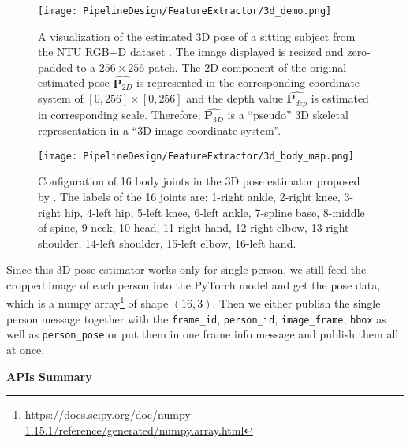 \begin{figure}[h!]
  \centering
  \texttt{[image: PipelineDesign/FeatureExtractor/3d\_demo.png]}
  \caption{A visualization of the estimated 3D pose of a sitting subject from the NTU RGB+D dataset
           \cite{DBLP:journals/corr/ShahroudyLNW16}. The image displayed is resized and zero-padded to
           a $256 \times 256$ patch. The 2D component of the original estimated pose $\hat{\mathbf{P}
           _{2D}}$ is represented in the corresponding coordinate system of $[0, 256] \times [0, 256]$
           and the depth value $\hat{\mathbf{P}_{dep}}$ is estimated in corresponding scale. Therefore,
           $\hat{\mathbf{P}_{3D}}$ is a “pseudo” 3D skeletal representation in a “3D image coordinate
           system”.}
  \label{fig:3d_demo}
\end{figure} 

\begin{figure}[h!]
  \centering
  \texttt{[image: PipelineDesign/FeatureExtractor/3d\_body\_map.png]}
  \caption{Configuration of 16 body joints in the 3D pose estimator proposed by 
           \cite{DBLP:journals/corr/ZhouH0XW17}. The labels of the 16 joints are: 1-right ankle, 
           2-right knee, 3-right hip, 4-left hip, 5-left knee, 6-left ankle, 7-spline base, 
           8-middle of spine, 9-neck, 10-head, 11-right hand, 12-right elbow, 13-right shoulder, 
           14-left shoulder, 15-left elbow, 16-left hand.}
  \label{fig:3d_body_map}
\end{figure} 

Since this 3D pose estimator works only for single person, we still feed the cropped image of each person into the PyTorch model and get the pose data, which is a numpy array\footnote{\url{https://docs.scipy.org/doc/numpy-1.15.1/reference/generated/numpy.array.html}} of shape $(16, 3)$. Then we either publish the single person message together with the \texttt{frame\_id}, \texttt{person\_id}, \texttt{image\_frame}, \texttt{bbox} as well as \texttt{person\_pose} or put them in one frame info message and publish them all at once. 

\textbf{APIs Summary}

